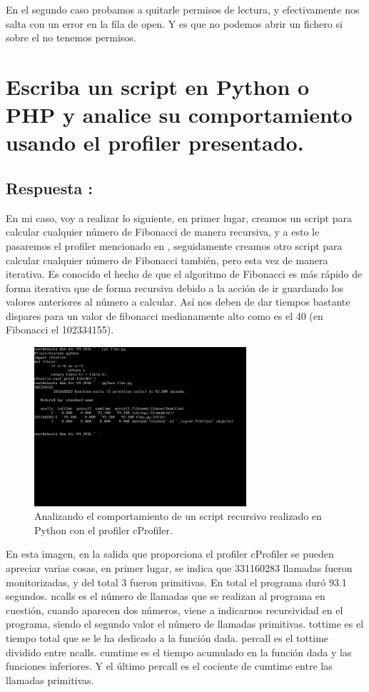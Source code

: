 En el segundo caso probamos a quitarle permisos de lectura, y efectivamente nos salta con un error en la fila de open. Y es que no podemos abrir un fichero si sobre el no tenemos permisos.
\newpage

\section{Escriba un script en Python o PHP y analice su comportamiento usando el profiler presentado.}
\subsection{Respuesta : }
En mi caso, voy a realizar lo siguiente, en primer lugar, creamos un script para calcular cualquier número de Fibonacci de manera recursiva, y a esto le pasaremos el profiler mencionado en \cite{PYTHON}, seguidamente creamos otro script para calcular cualquier número de Fibonacci también, pero esta vez de manera iterativa. Es conocido el hecho de que el algoritmo de Fibonacci es más rápido de forma iterativa que de forma recursiva debido a la acción de ir guardando los valores anteriores al número a calcular. Así nos deben de dar tiempos bastante dispares para un valor de fibonacci medianamente alto como es el 40 (en Fibonacci el 102334155).

\begin{figure}[H]
	\begin{center}
		\includegraphics[width=0.7\textwidth]{Imagenes/Fibonacci_recursivo}
		\caption{Analizando el comportamiento de un script recursivo realizado en Python con el profiler cProfiler.} \label{fig:25}
	\end{center}
\end{figure}

En esta imagen, en la salida que proporciona el profiler cProfiler se pueden apreciar varias cosas, en primer lugar, se indica que 331160283 llamadas fueron monitorizadas, y del total 3 fueron primitivas. En total el programa duró 93.1 segundos. 
ncalls es el número de llamadas que se realizan al programa en cuestión, cuando aparecen dos números, viene a indicarnos recursividad en el programa, siendo el segundo valor el número de llamadas primitivas. 
tottime es el tiempo total que se le ha dedicado a la función dada.
percall es el tottime dividido entre ncalls.
cumtime es el tiempo acumulado en la función dada y las funciones inferiores.
Y el último percall es el cociente de cumtime entre las llamadas primitivas.

